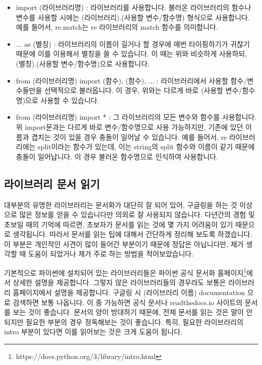 \documentclass[twoside]{article}
\begin{document}
\begin{itemize} 
\item import (라이브러리명) : 라이브러리를 사용합니다. 불러온 라이브러리의 함수나 변수를 사용할 시에는 (라이브러리).(사용할 변수/함수명) 형식으로 사용합니다. 예를 들어서, re.match는 re 라이브러리의 match 함수를 의미합니다. 
\item ... as (별칭) : 라이브러리의 이름이 길거나 할 경우에 매번 타이핑하기가 귀찮기 때문에 이를 이용해서 별칭을 쓸 수 있습니다. 이 때는 위와 비슷하게 사용하되, (별칭).(사용할 변수/함수명)으로 사용합니다. 
\item from (라이브러리명) import (함수), (함수), ... : 라이브러리에서 사용할 함수/변수들만을 선택적으로 불러옵니다. 이 경우, 위와는 다르게 바로 (사용할 변수/함수명)으로 사용할 수 있습니다. 
\item from (라이브러리명) import * : 그 라이브러리의 모든 변수와 함수를 사용합니다. 위 import문과는 다르게 바로 변수/함수명으로 사용 가능하지만, 기존에 있던 이름과 겹치는 것이 있을 경우 충돌이 일어날 수 있습니다. 예를 들어서, re 라이브러리에는 split이라는 함수가 있는데, 이는 string의 split 함수와 이름이 같기 때문에 충돌이 일어납니다. 이 경우 불러온 함수명으로 인식하여 사용합니다. 
\end{itemize}

\subsection{라이브러리 문서 읽기}

대부분의 유명한 라이브러리는 문서화가 대단히 잘 되어 있어, 구글링을 하는 것 이상으로 많은 정보를 얻을 수 있습니다만 의외로 잘 사용되지 않습니다. 다년간의 경험 및 초보일 때의 기억에 따르면, 초보자가 문서를 읽는 것에 몇 가지 어려움이 있기 때문으로 생각됩니다. 따라서 문서를 읽는 팁에 대해서 간단하게 정리해 보도록 하겠습니다. 이 부분은 개인적인 사견이 많이 들어간 부분이기 때문에 정답은 아닙니다만, 제가 생각할 때 도움이 되었거나 제가 주로 하는 방법을 적어보았습니다. 

기본적으로 파이썬에 설치되어 있는 라이브러리들은 파이썬 공식 문서화 홈페이지\footnote{https://docs.python.org/3/library/intro.html}에서 상세한 설명을 제공합니다. 
그렇지 않은 라이브러리들의 경우라도 보통은 라이브러리 홈페이지에서 설명을 제공합니다. 구글링 시 (라이브러리 이름) documentation 으로 검색하면 보통 나옵니다. 이 중 가능하면 공식 문서나 readthedocs.io 사이트의 문서를 보는 것이 좋습니다. 문서의 양이 방대하기 때문에, 전체 문서를 읽는 것은 말이 안되지만 필요한 부분의 경우 정독해보는 것이 좋습니다. 특히, 필요한 라이브러리의 intro 부분이 있다면 이를 읽어보는 것은 크게 도움이 됩니다. 
\end{document}
